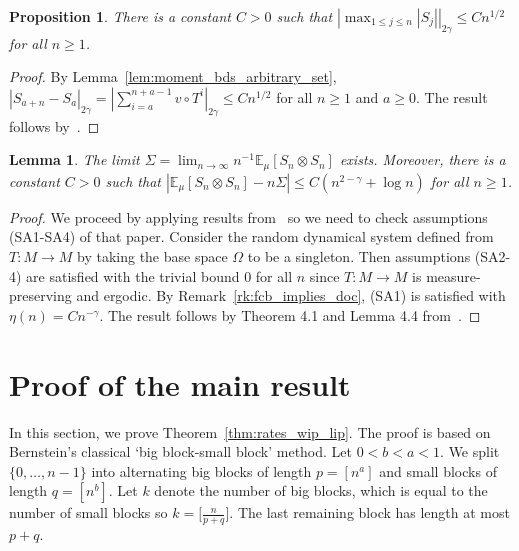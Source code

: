 \documentclass[11pt,a4paper,reqno,oneside]{amsart}
\newcommand{\pnorm}[1]{\left|#1\right|}
\newcommand{\Ex}[2][]{\mathbb{E}_{#1\!\!}\left[#2\right]}
\newtheorem{lemma}[theorem]{Lemma}
\newtheorem{prop}[theorem]{Proposition}
\theoremstyle{definition}
\theoremstyle{remark}
\numberwithin{equation}{section}
\begin{document}
	\begin{prop}\label{prop:maximal_ineq_birkhoff}
		There is a constant $ C>0 $ such that 
		$ \pnorm{\max_{1\le j\le n}|S_j|}_{2\gamma}\le Cn^{1/2}$ for all $n\ge 1$.
	\end{prop}
	\begin{proof}
		By Lemma~\ref{lem:moment_bds_arbitrary_set}, $\pnorm{S_{a+n}-S_a}_{2\gamma} = \pnorm{\sum_{i=a}^{n+a-1}v\circ T^i}_{2\gamma}\le Cn^{1/2}$ for all $n\ge 1$ and $a\ge 0$.
		The result follows by~\cite[Corollary B.2]{serfling}.
	\end{proof}
	\begin{lemma}\label{lem:var_S_n_error}The limit $\Sigma = \lim_{n\to \infty}n^{-1}\Ex[\mu]{S_n\otimes S_n}$ exists. Moreover, there is a constant $C>0$ such that $|\Ex[\mu]{S_n\otimes S_n} - n\Sigma|\le C(n^{2-\gamma}+\log n)$ for all $n\ge 1$. 
	\end{lemma}
	\begin{proof}
		We proceed by applying results from~\cite{hella_stenlund} so we need to check assumptions (SA1-SA4) of that paper. Consider the random dynamical system defined from $T:M\to M$ by taking the base space $\Omega$ to be a singleton. Then assumptions (SA2-4) are satisfied with the trivial bound $0$ for all $n$ since $T:M\to M$ is measure-preserving and ergodic. By Remark~\ref{rk:fcb_implies_doc}, (SA1) is satisfied with $\eta(n)=Cn^{-\gamma}$. The result follows by Theorem 4.1 and Lemma 4.4 from~\cite{hella_stenlund}.
	\end{proof}
	\section{Proof of the main result}\label{sec:proof_main_result}
	In this section, we prove Theorem~\ref{thm:rates_wip_lip}. The proof is based on Bernstein's classical `big block-small block' method. Let $ 0<b<a<1 $. We split $ \{0,\dots,n-1\} $ into alternating big blocks of length $ p=[n^a] $ and small blocks of length $ q=[n^b] $. Let $ k $ denote the number of big blocks, which is equal to the number of small blocks so $k = \big[\frac{n}{p+q}\big]$. The last remaining block has length at most $p+q$.
	
\end{document}
